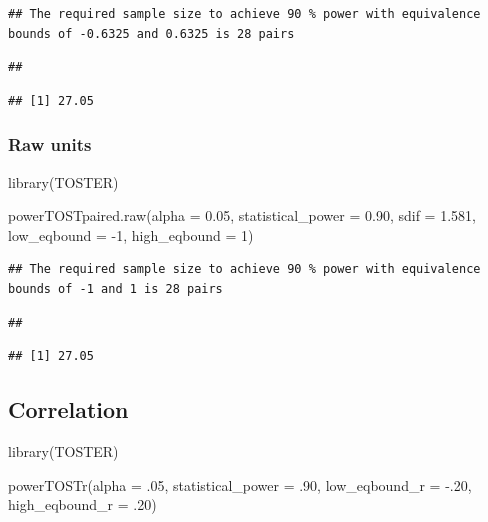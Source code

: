 \documentclass[
]{krantz}
\makeatletter
\newenvironment{Shaded}{\begin{snugshade}}{\end{snugshade}}
\newcommand{\AttributeTok}[1]{\textcolor[rgb]{0.61,0.61,0.61}{#1}}
\newcommand{\DecValTok}[1]{\textcolor[rgb]{0.06,0.06,0.06}{#1}}
\newcommand{\FloatTok}[1]{\textcolor[rgb]{0.06,0.06,0.06}{#1}}
\newcommand{\FunctionTok}[1]{\textcolor[rgb]{0,0,0}{#1}}
\newcommand{\NormalTok}[1]{#1}
\newcommand{\SpecialCharTok}[1]{\textcolor[rgb]{0,0,0}{#1}}
\newenvironment{kframe}{%
\medskip{}
\setlength{\fboxsep}{.8em}
 \def\at@end@of@kframe{}%
 \ifinner\ifhmode%
  \def\at@end@of@kframe{\end{minipage}}%
  \begin{minipage}{\columnwidth}%
 \fi\fi%
 \def\FrameCommand##1{\hskip\@totalleftmargin \hskip-\fboxsep
 \colorbox{shadecolor}{##1}\hskip-\fboxsep
     \hskip-\linewidth \hskip-\@totalleftmargin \hskip\columnwidth}%
 \MakeFramed {\advance\hsize-\width
   \@totalleftmargin\z@ \linewidth\hsize
   \@setminipage}}%
 {\par\unskip\endMakeFramed%
 \at@end@of@kframe}
\renewenvironment{Shaded}{\begin{kframe}}{\end{kframe}}
\makeatother
\begin{document}
\begin{verbatim}
## The required sample size to achieve 90 % power with equivalence bounds of -0.6325 and 0.6325 is 28 pairs
\end{verbatim}

\begin{verbatim}
## 
\end{verbatim}

\begin{verbatim}
## [1] 27.05
\end{verbatim}

\hypertarget{raw-units-3}{%
\subsubsection{Raw units}\label{raw-units-3}}

\begin{Shaded}
\begin{Highlighting}[]
\FunctionTok{library}\NormalTok{(TOSTER)}

\FunctionTok{powerTOSTpaired.raw}\NormalTok{(}\AttributeTok{alpha =} \FloatTok{0.05}\NormalTok{,}
                    \AttributeTok{statistical\_power =} \FloatTok{0.90}\NormalTok{,}
                    \AttributeTok{sdif =} \FloatTok{1.581}\NormalTok{,}
                    \AttributeTok{low\_eqbound =} \SpecialCharTok{{-}}\DecValTok{1}\NormalTok{,}
                    \AttributeTok{high\_eqbound =} \DecValTok{1}\NormalTok{)}
\end{Highlighting}
\end{Shaded}

\begin{verbatim}
## The required sample size to achieve 90 % power with equivalence bounds of -1 and 1 is 28 pairs
\end{verbatim}

\begin{verbatim}
## 
\end{verbatim}

\begin{verbatim}
## [1] 27.05
\end{verbatim}

\hypertarget{correlation-1}{%
\subsection{Correlation}\label{correlation-1}}

\begin{Shaded}
\begin{Highlighting}[]
\FunctionTok{library}\NormalTok{(TOSTER)}

\FunctionTok{powerTOSTr}\NormalTok{(}\AttributeTok{alpha =}\NormalTok{ .}\DecValTok{05}\NormalTok{,}
           \AttributeTok{statistical\_power =}\NormalTok{ .}\DecValTok{90}\NormalTok{,}
           \AttributeTok{low\_eqbound\_r =} \SpecialCharTok{{-}}\NormalTok{.}\DecValTok{20}\NormalTok{, }
           \AttributeTok{high\_eqbound\_r =}\NormalTok{ .}\DecValTok{20}\NormalTok{)}
\end{Highlighting}
\end{Shaded}
\end{document}
